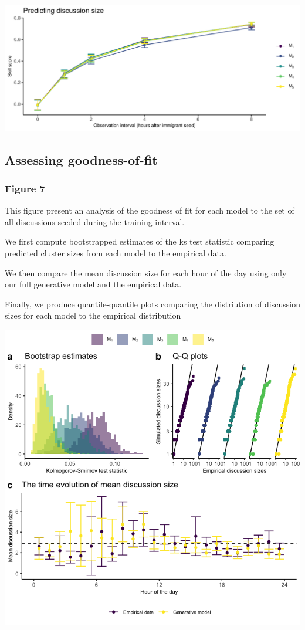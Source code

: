 \documentclass[
]{article}
\begin{document}
\includegraphics{figures_and_tables_files/figure-latex/crps_assessment-1.pdf}

\hypertarget{assessing-goodness-of-fit}{%
\subsection{Assessing goodness-of-fit}\label{assessing-goodness-of-fit}}

\hypertarget{figure-7}{%
\subsubsection{Figure 7}\label{figure-7}}

This figure present an analysis of the goodness of fit for each model to
the set of all discussions seeded during the training interval.

We first compute bootstrapped estimates of the ks test statistic
comparing predicted cluster sizes from each model to the empirical data.

We then compare the mean discussion size for each hour of the day using
only our full generative model and the empirical data.

Finally, we produce quantile-quantile plots comparing the distriution of
discussion sizes for each model to the empirical distribution

\includegraphics{figures_and_tables_files/figure-latex/gof-1.png}
\end{document}
